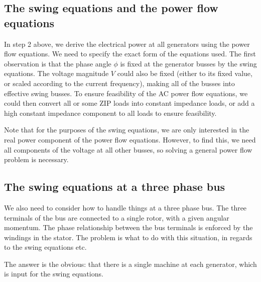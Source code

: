 \documentclass[11pt]{article}
\begin{document}
\subsection{The swing equations and the power flow equations}
In step 2 above, we derive the electrical power at all generators using the power flow equations. We need to specify the exact form of the equations used. The first observation is that the phase angle $\phi$ is fixed at the generator busses by the swing equations. The voltage magnitude $V$ could also be fixed (either to its fixed value, or scaled according to the current frequency), making all of the busses into effective swing busses. To ensure feasibility of the AC power flow equations, we could then convert all or some ZIP loads into constant impedance loads, or add a high constant impedance component to all loads to ensure feasibility.

Note that for the purposes of the swing equations, we are only interested in the real power component of the power flow equations. However, to find this, we need all components of the voltage at all other busses, so solving a general power flow problem is necessary.

\subsection{The swing equations at a three phase bus}
We also need to consider how to handle things at a three phase bus. The three terminals of the bus are connected to a single rotor, with a given angular momentum. The phase relationship between the bus terminals is enforced by the windings in the stator. The problem is what to do with this situation, in regards to the swing equations etc.

The answer is the obvious: that there is a single machine at each generator, which is input for the swing equations. 
\end{document}
